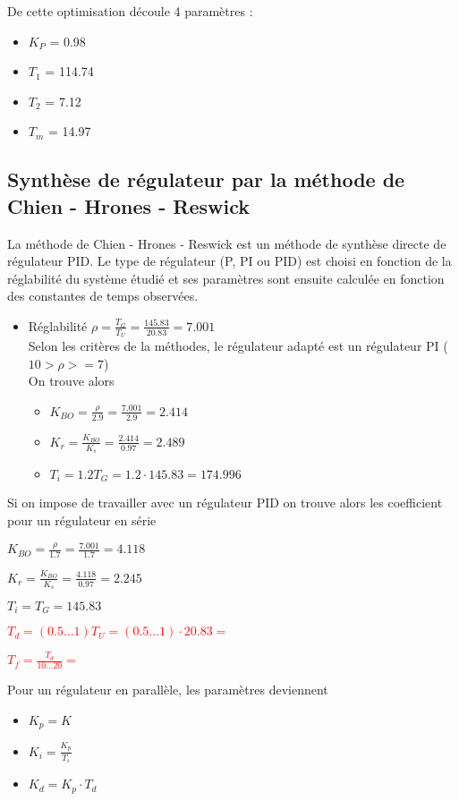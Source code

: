 De cette optimisation découle 4 paramètres :
\begin{itemize}
\item $K_{P}$ = 0.98
\item $T_{1}$ = 114.74
\item $T_{2}$ = 7.12
\item $T_{m}$ = 14.97
\end{itemize}

\subsection{Synthèse de régulateur par la méthode de Chien - Hrones - Reswick}
La méthode de Chien - Hrones - Reswick est un méthode de synthèse directe de régulateur PID. Le type de régulateur (P, PI ou PID) est choisi en fonction de la réglabilité du système étudié et ses paramètres sont ensuite calculée en fonction des constantes de temps observées. 

\begin{itemize}
\item Réglabilité $\rho = \frac{T_{G}}{T_{U}} = \frac{145.83}{20.83} = 7.001$\\
Selon les critères de la méthodes, le régulateur adapté est un régulateur PI ($10 > \rho >= 7$)\\

On trouve alors 
\begin{itemize}
\item $K_{BO} = \frac{\rho}{2.9} = \frac{7.001}{2.9} = 2.414$
\item $K_{r} = \frac{K_{BO}}{K_{s}} = \frac{2.414}{0.97} = 2.489$
\item $T_{i} = 1.2T_{G} = 1.2 \cdot 145.83 = 174.996$
\end{itemize}
\end{itemize}

Si on impose de travailler avec un régulateur PID on trouve alors les coefficient pour un régulateur en série

\begin{itemize}
\item $K_{BO} = \frac{\rho}{1.7} = \frac{7.001}{1.7} = 4.118$
\item $K_{r} = \frac{K_{BO}}{K_{s}} = \frac{4.118}{0.97} = 2.245$
\item $T_{i} = T_{G} = 145.83$

\textcolor{red}{\item $T_{d} = (0.5...1)T_{U} = (0.5...1) \cdot 20.83 = $
\item $T_{f} = \frac{T_{d}}{10...20} = $}
\end{itemize}

Pour un régulateur en parallèle, les paramètres deviennent 
\begin{itemize}
\item $K_{p} = K$
\item $K_{i} = \frac{K_{p}}{T_{i}}$
\item $K_{d} = K_{p} \cdot T_{d}$
\end{itemize}